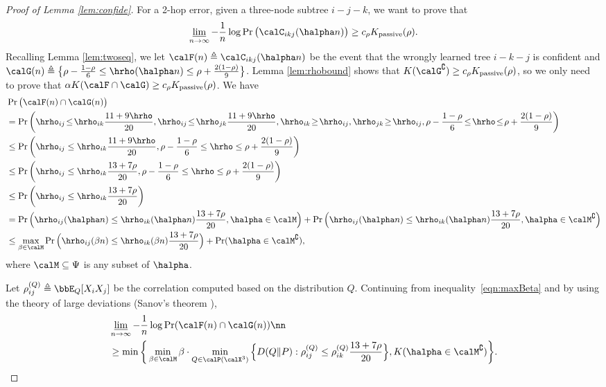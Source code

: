 \documentclass[11pt,onecolumn]{article}
\newcommand{\Passive}{{\rm passive}}
\begin{document}
\begin{proof}[Proof of Lemma \ref{lem:confide}]
	For a 2-hop error, given a three-node subtree $i-j-k$, we want to prove  that
	\begin{align}
    	\varliminf_{n\rightarrow\infty}-\frac{1}{n}\log\Pr\big(\calC_{ikj}(\halpha n)\big)\geq c_{\rho}K _{\Passive}(\rho).
	\end{align}
	Recalling Lemma \ref{lem:twoseq}, we let $\calF(n)\triangleq\calC_{ikj}(\halpha n)$ be the event that the wrongly learned tree $i-k-j$ is confident and $\calG(n)\triangleq\big\{\rho-\frac{1-\rho}{6}\leq\hrho(\halpha n)\leq\rho+\frac{2(1-\rho)}{9}\big\}$. Lemma \ref{lem:rhobound} shows that $K (\calG^{\complement})\geq c_{\rho}K _{\Passive}(\rho)$, so we only need to prove that $\alpha K (\calF\cap \calG)\geq c_{\rho}K _{\Passive}(\rho)$. We have 
	\begin{align}
		&\Pr\big(\calF(n)\cap \calG(n)\big)\nonumber\\
		&=\Pr\bigg(\hrho_{ij}\!\leq\! \hrho_{ik}\frac{11+9\hrho}{20},\hrho_{ij}\!\leq\! \hrho_{jk}\frac{11+9\hrho}{20},\hrho_{ik}\!\geq\! \hrho_{ij},\hrho_{jk}\!\geq\! \hrho_{ij},\rho-\frac{1-\rho}{6}\!\leq\!\hrho\!\leq\!\rho+\frac{2(1-\rho)}{9}\bigg)\\
		&\leq\Pr\bigg(\hrho_{ij}\leq \hrho_{ik}\frac{11+9\hrho}{20}, \rho-\frac{1-\rho}{6}\leq\hrho\leq\rho+\frac{2(1-\rho)}{9}\bigg)\\
		&\leq\Pr\bigg(\hrho_{ij}\leq \hrho_{ik}\frac{13+7\rho}{20}, \rho-\frac{1-\rho}{6}\leq\hrho\leq\rho+\frac{2(1-\rho)}{9}\bigg)\\
		&\leq\Pr\bigg(\hrho_{ij}\leq \hrho_{ik}\frac{13+7\rho}{20}\bigg)\\
		&=\Pr\Big(\hrho_{ij}(\halpha n)\leq \hrho_{ik}(\halpha n)\frac{13+7\rho}{20}, \halpha\in \calM\Big)+\Pr\Big(\hrho_{ij}(\halpha n)\leq \hrho_{ik}(\halpha n)\frac{13+7\rho}{20}, \halpha\in \calM^{\complement}\Big) \\
		&\leq \max_{\beta\in \calM}\Pr\Big(\hrho_{ij}(\beta n)\leq \hrho_{ik}(\beta n)\frac{13+7\rho}{20}\Big)+\Pr( \halpha\in \calM^{\complement}), \label{eqn:maxBeta}
	\end{align}
	where $\calM\subseteq \Psi$ is any  subset of $\halpha$.
	
	Let $\rho^{(Q)}_{ij}\triangleq\bbE_Q[X_iX_j]$ be the correlation computed based on the distribution $Q$. Continuing from inequality~\eqref{eqn:maxBeta} and  by using the theory of large deviations (Sanov's theorem \cite{zeitouni1998large}), 
	\begin{align}
		&\varliminf_{n\rightarrow\infty}-\frac{1}{n}\log\Pr(\calF(n)\cap \calG(n))\nn\\*
		&\geq \min\bigg\{\min_{\beta\in \calM} \beta\cdot \min_{Q\in\calP(\calX^{3})} \Big\{D(Q\|P):\rho^{(Q)}_{ij}\leq\rho^{(Q)}_{ik}\frac{13+7\rho}{20}\Big\},K (\halpha\in \calM^{\complement})\bigg\}. \label{eqn:mink}
	\end{align}


\end{proof}
\end{document}
